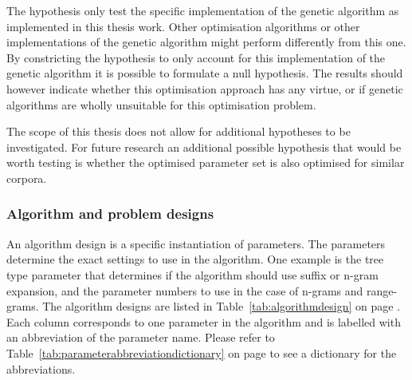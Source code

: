 The hypothesis only test the specific implementation of the genetic algorithm as implemented in this thesis work. Other optimisation algorithms or other implementations of the genetic algorithm might perform differently from this one. By constricting the hypothesis to only account for this implementation of the genetic algorithm it is possible to formulate a null hypothesis. The results should however indicate whether this optimisation approach has any virtue, or if genetic algorithms are wholly unsuitable for this optimisation problem.

The scope of this thesis does not allow for additional hypotheses to be investigated. For future research an additional possible hypothesis that would be worth testing is whether the optimised parameter set is also optimised for similar corpora.

\subsubsection{Algorithm and problem designs}
An algorithm design is a specific instantiation of parameters. The parameters determine the exact settings to use in the algorithm. One example is the tree type parameter that determines if the algorithm should use suffix or n-gram expansion, and the parameter numbers to use in the case of n-grams and range-grams. The algorithm designs are listed in Table~\ref{tab:algorithmdesign} on page \pageref{tab:algorithmdesign}. Each column corresponds to one parameter in the algorithm and is labelled with an abbreviation of the parameter name. Please refer to Table~\ref{tab:parameterabbreviationdictionary} on page \pageref{tab:parameterabbreviationdictionary} to see a dictionary for the abbreviations.

